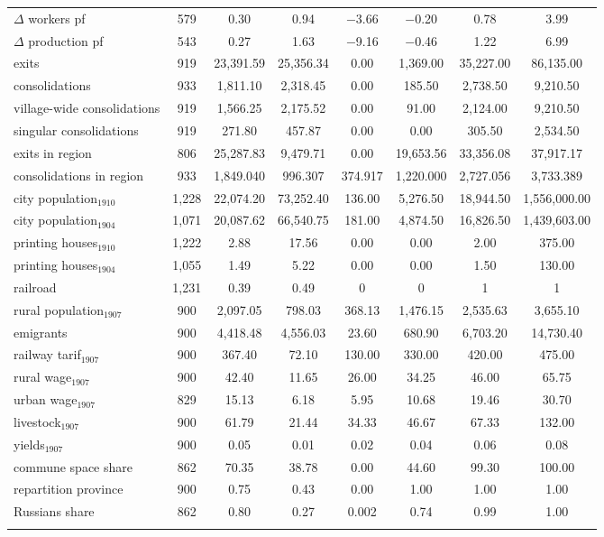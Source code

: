 \documentclass[a4paper, 12pt]{article}
\begin{document}
\begin{table}[!htbp]
{\begin{tabular}{@{\extracolsep{5pt}}lccccccc}
$\Delta$ workers pf & 579 & 0.30 & 0.94 & $-$3.66 & $-$0.20 & 0.78 & 3.99 \\ 
$\Delta$ production pf & 543 & 0.27 & 1.63 & $-$9.16 & $-$0.46 & 1.22 & 6.99 \\ 
exits & 919 & 23,391.59 & 25,356.34 & 0.00 & 1,369.00 & 35,227.00 & 86,135.00 \\ 
consolidations & 933 & 1,811.10 & 2,318.45 & 0.00 & 185.50 & 2,738.50 & 9,210.50 \\ 
village-wide consolidations & 919 & 1,566.25 & 2,175.52 & 0.00 & 91.00 & 2,124.00 & 9,210.50 \\ 
singular consolidations & 919 & 271.80 & 457.87 & 0.00 & 0.00 & 305.50 & 2,534.50 \\ 
exits in region & 806 & 25,287.83 & 9,479.71 & 0.00 & 19,653.56 & 33,356.08 & 37,917.17 \\ 
consolidations in region & 933 & 1,849.040 & 996.307 & 374.917 & 1,220.000 & 2,727.056 & 3,733.389 \\
city population$_{1910}$ & 1,228 & 22,074.20 & 73,252.40 & 136.00 & 5,276.50 & 18,944.50 & 1,556,000.00 \\ 
city population$_{1904}$ & 1,071 & 20,087.62 & 66,540.75 & 181.00 & 4,874.50 & 16,826.50 & 1,439,603.00 \\ 
printing houses$_{1910}$ & 1,222 & 2.88 & 17.56 & 0.00 & 0.00 & 2.00 & 375.00 \\ 
printing houses$_{1904}$ & 1,055 & 1.49 & 5.22 & 0.00 & 0.00 & 1.50 & 130.00 \\ 
railroad & 1,231 & 0.39 & 0.49 & 0 & 0 & 1 & 1 \\ 
rural population$_{1907}$ & 900 & 2,097.05 & 798.03 & 368.13 & 1,476.15 & 2,535.63 & 3,655.10 \\
emigrants & 900 & 4,418.48 & 4,556.03 & 23.60 & 680.90 & 6,703.20 & 14,730.40 \\ 
railway tarif$_{1907}$ & 900 & 367.40 & 72.10 & 130.00 & 330.00 & 420.00 & 475.00 \\ 
rural wage$_{1907}$ & 900 & 42.40 & 11.65 & 26.00 & 34.25 & 46.00 & 65.75 \\ 
urban wage$_{1907}$ & 829 & 15.13 & 6.18 & 5.95 & 10.68 & 19.46 & 30.70 \\ 
livestock$_{1907}$ & 900 & 61.79 & 21.44 & 34.33 & 46.67 & 67.33 & 132.00 \\ 
yields$_{1907}$ & 900 & 0.05 & 0.01 & 0.02 & 0.04 & 0.06 & 0.08 \\ 
commune space share & 862 & 70.35 & 38.78 & 0.00 & 44.60 & 99.30 & 100.00 \\ 
repartition province & 900 & 0.75 & 0.43 & 0.00 & 1.00 & 1.00 & 1.00 \\ 
Russians share & 862 & 0.80 & 0.27 & 0.002 & 0.74 & 0.99 & 1.00 \\ 
\hline \\[-1.8ex] 
\end{tabular} 
}
\end{table}
\end{document}
